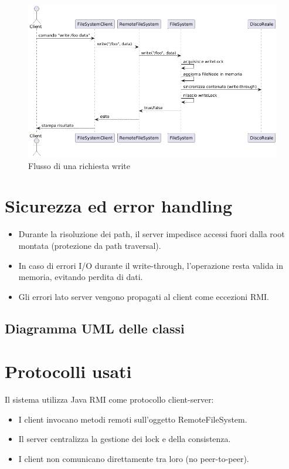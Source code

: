 \documentclass[11pt]{article}
\begin{document}
\begin{figure}[htbp]
\centering
\includegraphics[width=.9\linewidth]{img/uml_op.png}
\caption{Flusso di una richiesta write}
\end{figure}
\section{Sicurezza ed error handling}
\label{sec:orga2a36d9}
\begin{itemize}
\item Durante la risoluzione dei path, il server impedisce accessi fuori dalla root montata (protezione da path traversal).
\item In caso di errori I/O durante il write-through, l’operazione resta valida in memoria, evitando perdita di dati.
\item Gli errori lato server vengono propagati al client come eccezioni RMI.
\end{itemize}
\subsection{Diagramma UML delle classi}
\label{sec:org5970416}
\section{Protocolli usati}
\label{sec:org733059d}
Il sistema utilizza Java RMI come protocollo client-server:
\begin{itemize}
\item I client invocano metodi remoti sull’oggetto RemoteFileSystem.
\item Il server centralizza la gestione dei lock e della consistenza.
\item I client non comunicano direttamente tra loro (no peer-to-peer).
\end{itemize}
\end{document}
